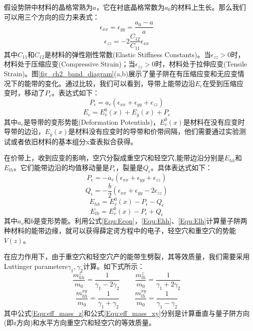 假设势阱中材料的晶格常熟为$a$，它在衬底晶格常数为$a_{0}$的材料上生长。那么我们可以用三个方向的应力来表式：
\begin{equation}
\label{Equ:exx}
\epsilon_{xx} = \epsilon_{yy} = \frac{a_{0}-a}{a}
\end{equation}
\begin{equation}
\label{Equ:ezz}
\epsilon_{zz} = -2\frac{C_{12}}{C_{11}}\epsilon_{xx}
\end{equation}
其中$C_{11}$和$C_{12}$是材料的弹性刚性常数(Elastic Stiffness Constants)。当$\epsilon_{zz}>0$时，材料处于压缩应变(Compressive Strain)；当$\epsilon_{zz}>0$时，材料处于拉伸应变(Tensile Strain)。图\ref{fig_ch2_band_diagram}(a,b)展示了量子阱在有压缩应变和无应变情况下的能带的变化。通过比较，我们可以看到，导带上能带边沿$E_c$在受到压缩应变时，移动了$P_{c}$。表达式如下：
\begin{equation}
\label{Equ:Pc}
P_{c} = a_{c}(\epsilon_{xx}+\epsilon_{yy}+\epsilon_{zz})
\end{equation}
\begin{equation}
\label{Equ:Econ}
E_{c} = E_{v}^{0}(x)+E_{g}(x)+P_{c}
\end{equation}
其中$a_{c}$是导带的变形势能(Deformation Potentials)，$E_v^0(x)$是材料在没有应变时导带的边沿，$E_{g}(x)$是材料没有应变时的导带和价带间隔，他们需要通过实验测试或者依旧材料的基本组分x查表拟合获得\cite{chuang1995physics,li2000material}。

在价带上，收到应变的影响，空穴分裂成重空穴和轻空穴,能带边沿分别是$E_{hh}$和$E_{lh}$。它们能带边沿的均值移动量是$P_{\epsilon}$，裂量是$Q_{\epsilon}$。具体表达式如下：
\begin{equation}
\label{Equ:Pe}
P_{\epsilon} = -a_{v}(\epsilon_{xx}+\epsilon_{yy}+\epsilon_{zz})
\end{equation}
\begin{equation}
\label{Equ:Qe}
Q_{\epsilon} = -\frac{b}{2}(\epsilon_{xx}+\epsilon_{yy}-2\epsilon_{zz})
\end{equation}
\begin{equation}
\label{Equ:Ehh}
E_{hh} = E_{v}^{0}(x)-P_{\epsilon}-Q_{\epsilon}
\end{equation}
\begin{equation}
\label{Equ:Elh}
E_{lh} = E_{v}^{0}(x)-P_{\epsilon}+Q_{\epsilon}
\end{equation}
其中$a_{v}$和$b$是变形势能。利用公式\ref{Equ:Econ}，\ref{Equ:Ehh}、\ref{Equ:Elh}计算量子阱两种材料的能带边缘，就可以获得薛定谔方程中的电子，轻空穴和重空穴的势能$V(z)$。

在应力作用下，由于重空穴和轻空穴产的能带生劈裂，其等效质量，我们需要采用Luttinger parameters$\gamma_1, \gamma_2$计算。如下式所示：
\begin{equation}
\label{Equ:eff_mass_z}
\frac{m_{hh}^z}{m_0}=\frac{1}{\gamma_1-2\gamma_2}~~~~~~~~~~\frac{m_{lh}^z}{m_0}=\frac{1}{\gamma_1+2\gamma_2}
\end{equation}
\begin{equation}
\label{Equ:eff_mass_xy}
\frac{m_{hh}^{xy}}{m_0}=\frac{1}{\gamma_1+\gamma_2}~~~~~~~~~~\frac{m_{lh}^{xy}}{m_0}=\frac{1}{\gamma_1-\gamma_2}
\end{equation}
其中公式\ref{Equ:eff_mass_z}和公式\ref{Equ:eff_mass_xy}分别是计算垂直与量子阱方向(即z方向)和水平方向重空穴和轻空穴的等效质量\cite{eppenga1987new}。

